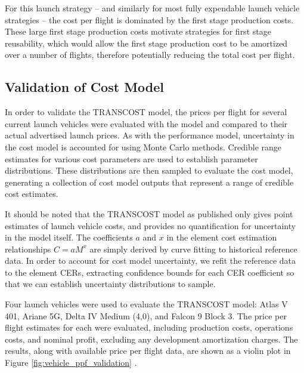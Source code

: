 \documentclass[conf]{new-aiaa}
\begin{document}
\begin{multicols}{2}
For this launch strategy -- and similarly for most fully expendable launch vehicle strategies -- the cost per flight is dominated by the first stage production costs. These large first stage production costs motivate strategies for first stage reusability, which would allow the first stage production cost to be amortized over a number of flights, therefore potentially reducing the total cost per flight. 

\subsection{Validation of Cost Model}

In order to validate the TRANSCOST model, the prices per flight for several current launch vehicles were evaluated with the model and compared to their actual advertised launch prices. As with the performance model, uncertainty in the cost model is accounted for using Monte Carlo methods. Credible range estimates for various cost parameters are used to establish parameter distributions. These distributions are then sampled to evaluate the cost model, generating a collection of cost model outputs that represent a range of credible cost estimates.

It should be noted that the TRANSCOST model as published only gives point estimates of launch vehicle costs, and provides no quantification for uncertainty in the model itself. The coefficients $a$ and $x$ in the element cost estimation relationships $C = a M^x$ are simply derived by curve fitting to historical reference data. In order to account for cost model uncertainty, we refit the reference data to the element CERs, extracting confidence bounds for each CER coefficient so that we can establish uncertainty distributions to sample. 

Four launch vehicles were used to evaluate the TRANSCOST model: Atlas V 401, Ariane 5G, Delta IV Medium (4,0), and Falcon 9 Block 3. The price per flight estimates for each were evaluated, including production costs, operations costs, and nominal profit, excluding any development amortization charges. The results, along with available price per flight data, are shown as a violin plot in Figure \ref{fig:vehicle_ppf_validation} \cite{ULARocketBuilder, FlightGlobalArianespace, GAO2017, SpaceXCapabilities}. 


\end{multicols}
\end{document}
